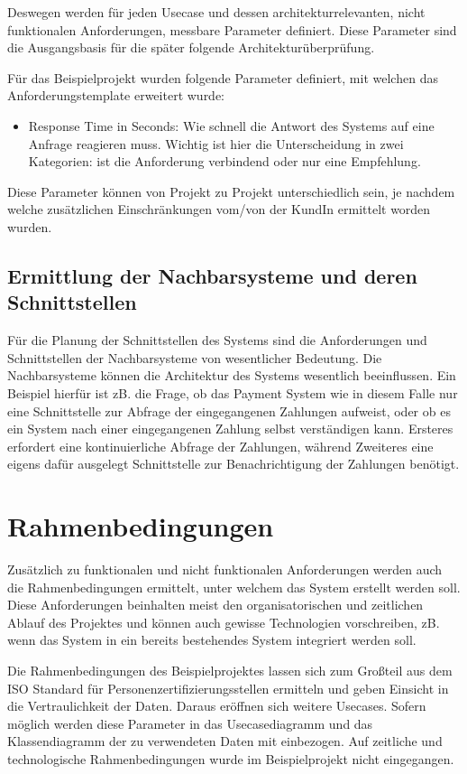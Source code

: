 Deswegen werden für jeden Usecase und dessen architekturrelevanten, nicht funktionalen Anforderungen, messbare Parameter definiert. Diese Parameter sind die Ausgangsbasis für die später folgende Architekturüberprüfung.

Für das Beispielprojekt wurden folgende Parameter definiert, mit welchen das Anforderungstemplate erweitert wurde:

\begin{itemize}
  \item Response Time in Seconds: Wie schnell die Antwort des Systems auf eine Anfrage reagieren muss. Wichtig ist hier die Unterscheidung in zwei Kategorien: ist die Anforderung verbindend oder nur eine Empfehlung.
\end{itemize}

Diese Parameter können von Projekt zu Projekt unterschiedlich sein, je nachdem welche zusätzlichen Einschränkungen vom/von der KundIn ermittelt worden wurden.

\subsection{Ermittlung der Nachbarsysteme und deren Schnittstellen}
Für die Planung der Schnittstellen des Systems sind die Anforderungen und Schnittstellen der Nachbarsysteme von wesentlicher Bedeutung. Die Nachbarsysteme können die Architektur des Systems wesentlich beeinflussen. Ein Beispiel hierfür ist zB. die Frage, ob das Payment System wie in diesem Falle nur eine Schnittstelle zur Abfrage der eingegangenen Zahlungen aufweist, oder ob es ein System nach einer eingegangenen Zahlung selbst verständigen kann. Ersteres erfordert eine kontinuierliche Abfrage der Zahlungen, während Zweiteres eine eigens dafür ausgelegt Schnittstelle zur Benachrichtigung der Zahlungen benötigt.

\section{Rahmenbedingungen}
Zusätzlich zu funktionalen und nicht funktionalen Anforderungen werden auch die Rahmenbedingungen ermittelt, unter welchem das System erstellt werden soll. Diese Anforderungen beinhalten meist den organisatorischen und zeitlichen Ablauf des Projektes und können auch gewisse Technologien vorschreiben, zB. wenn das System in ein bereits bestehendes System integriert werden soll. \cite[S. 9]{review}\cite[S. 110]{softarch}

Die Rahmenbedingungen des Beispielprojektes lassen sich zum Großteil aus dem ISO Standard für Personenzertifizierungsstellen ermitteln \cite{ISO_CERT} und geben Einsicht in die Vertraulichkeit der Daten. Daraus eröffnen sich weitere Usecases. Sofern möglich werden diese Parameter in das Usecasediagramm und das Klassendiagramm der zu verwendeten Daten mit einbezogen. Auf zeitliche und technologische Rahmenbedingungen wurde im Beispielprojekt nicht eingegangen.


